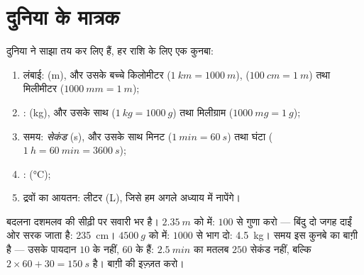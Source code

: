 \section{दुनिया के मात्रक}

\begin{definition}[वैज्ञानिक का शुरुआती डिब्बा]\label{def:g6:measurement-in-science:units}
दुनिया ने साझा  तय कर लिए हैं, हर राशि के लिए एक कुनबा:
\begin{enumerate}
  \item लंबाई: \emph{} (\unit{m}), और उसके बच्चे किलोमीटर
        ($\qty{1}{km} = \qty{1000}{m}$), 
        ($\qty{100}{cm} = \qty{1}{m}$) तथा मिलीमीटर
        ($\qty{1000}{mm} = \qty{1}{m}$);
  \item {}: \emph{} (\unit{kg}), और उसके साथ 
        ($\qty{1}{kg} = \qty{1000}{g}$) तथा मिलीग्राम
        ($\qty{1000}{mg} = \qty{1}{g}$);
  \item समय: \emph{सेकंड} (\unit{s}), और उसके साथ मिनट
        ($\qty{1}{min} = \qty{60}{s}$) तथा घंटा
        ($\qty{1}{h} = \qty{60}{min} = \qty{3600}{s}$);
  \item {}:  (\unit{\celsius});
  \item द्रवों का आयतन: लीटर (\unit{L}), जिसे हम अगले अध्याय में
        नापेंगे।
\end{enumerate}
\end{definition}

\begin{example}\label{ex:g6:measurement-in-science:convert}
 बदलना दशमलव की सीढ़ी पर सवारी भर है। $\qty{2.35}{m}$ को
 में: $100$ से गुणा करो --- बिंदु दो जगह दाईं ओर सरक जाता है:
\qty{235}{cm}। $\qty{4500}{g}$ को  में: $1000$ से भाग दो:
\qty{4.5}{kg}। समय इस कुनबे का बाग़ी है --- उसके पायदान $10$ के नहीं,
$60$ के हैं: $\qty{2.5}{min}$ का मतलब $250$ सेकंड नहीं, बल्कि
$2 \times 60 + 30 = \qty{150}{s}$ है। बाग़ी की इज़्ज़त करो।
\end{example}

